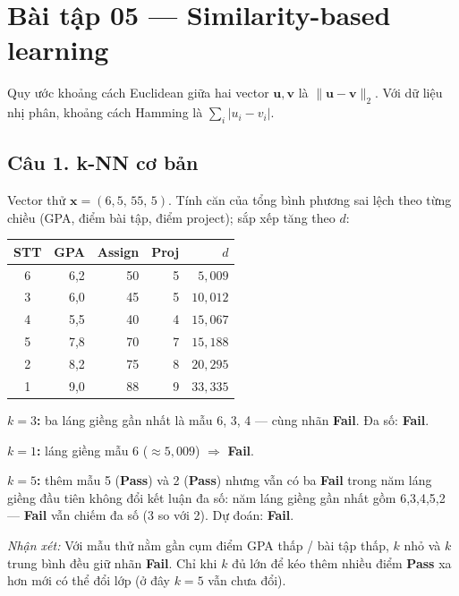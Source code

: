 \section*{Bài tập 05 --- Similarity-based learning}

Quy ước khoảng cách Euclidean giữa hai vector \(\mathbf{u},\mathbf{v}\) là
\(\|\mathbf{u}-\mathbf{v}\|_2\). Với dữ liệu nhị phân, khoảng cách Hamming là
\(\sum_i |u_i-v_i|\).

\subsection*{Câu 1. k-NN cơ bản}

Vector thử \(\mathbf{x}=(6{,}5,\,55,\,5)\). Tính căn của tổng bình phương sai lệch theo từng chiều (GPA, điểm bài tập, điểm project); sắp xếp tăng theo $d$:

\begin{center}
{\small
\begin{tabular}{@{}crrrr@{}}\toprule
STT & GPA & Assign & Proj & $d$ \\\midrule
6 & 6,2 & 50 & 5 & $5{,}009$ \\
3 & 6,0 & 45 & 5 & $10{,}012$ \\
4 & 5,5 & 40 & 4 & $15{,}067$ \\
5 & 7,8 & 70 & 7 & $15{,}188$ \\
2 & 8,2 & 75 & 8 & $20{,}295$ \\
1 & 9,0 & 88 & 9 & $33{,}335$ \\\bottomrule
\end{tabular}
}
\end{center}

\textbf{$k=3$:} ba láng giềng gần nhất là mẫu 6, 3, 4 --- cùng nhãn \textbf{Fail}. Đa số: \textbf{Fail}.

\textbf{$k=1$:} láng giềng mẫu 6 ($\approx 5{,}009$) $\Rightarrow$ \textbf{Fail}.

\textbf{$k=5$:} thêm mẫu 5 (\textbf{Pass}) và 2 (\textbf{Pass}) nhưng vẫn có ba \textbf{Fail} trong năm láng giềng đầu tiên không đổi kết luận đa số: năm láng giềng gần nhất gồm 6,3,4,5,2 --- \textbf{Fail} vẫn chiếm đa số (3 so với 2). Dự đoán: \textbf{Fail}.

\textit{Nhận xét:} Với mẫu thử nằm gần cụm điểm GPA thấp / bài tập thấp, $k$ nhỏ và $k$ trung bình đều giữ nhãn \textbf{Fail}. Chỉ khi $k$ đủ lớn để kéo thêm nhiều điểm \textbf{Pass} xa hơn mới có thể đổi lớp (ở đây $k=5$ vẫn chưa đổi).

